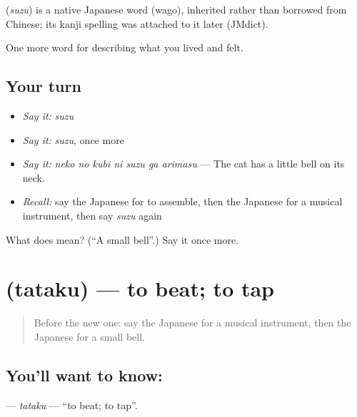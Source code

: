 \begin{cousinweb}
\textbf{} (\emph{suzu}) is a native Japanese word (wago), inherited rather than borrowed from Chinese; its kanji spelling was attached to it later (JMdict).
\end{cousinweb}

\begin{grammarlens}[title={What you've built}]
One more word for describing what you lived and felt.
\end{grammarlens}

\subsection*{Your turn}
\begin{itemize}
\raggedright
  \item \emph{Say it:} \emph{suzu}
  \item \emph{Say it:} \emph{suzu}, once more
  \item \emph{Say it:} \emph{neko no kubi ni suzu ga arimasu} — The cat has a little bell on its neck.
  \item \emph{Recall:} say the Japanese for to assemble, then the Japanese for a musical instrument, then say \emph{suzu} again
\end{itemize}

\begin{tcolorbox}[breakable,colback=teal!4,colframe=teal!35!black,title={Before you move on}]
What does  mean? (\textquotedblleft{}A small bell\textquotedblright{}.) Say it once more.
\end{tcolorbox}
\section[\texorpdfstring{\ja{たたく} (tataku)}{たたく (tataku)}]{ (tataku) — to beat; to tap}

\label{lesson:JA-C469-tataku}



\begin{quote}
Before the new one: say the Japanese for a musical instrument, then the Japanese for a small bell.
\end{quote}

\subsection*{You'll want to know: }
\textbf{} — \emph{tataku} — \textquotedblleft{}to beat; to tap\textquotedblright{}.

